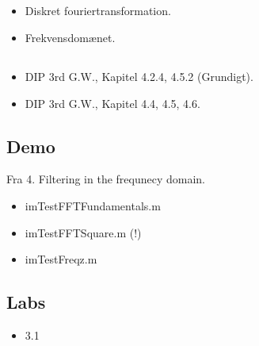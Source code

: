 \subsection{\subtopics}

\begin{itemize}
	\item Diskret fouriertransformation.
	\item Frekvensdomænet.
\end{itemize}

\subsection{\curriculum}

\begin{itemize}
	\item DIP 3rd G.W., Kapitel 4.2.4, 4.5.2 (Grundigt).
	\item DIP 3rd G.W., Kapitel 4.4, 4.5, 4.6.
\end{itemize}

\subsection{Demo}

Fra 4. Filtering in the frequnecy domain.

\begin{itemize}
	\item imTestFFTFundamentals.m
	\item imTestFFTSquare.m (!)
	\item imTestFreqz.m
\end{itemize}

\subsection{Labs}

\begin{itemize}
	\item 3.1
\end{itemize}
